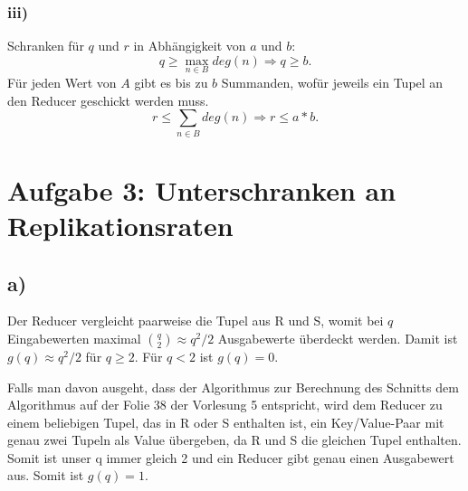 \documentclass{article}
\begin{document}

\subsubsection*{iii)}
Schranken f\"ur $q$ und $r$ in Abh\"angigkeit von $a$ und $b$:
$$q \geq \max_{n\in B} deg(n) \Rightarrow q \geq b.$$
F\"ur jeden Wert von $A$ gibt es bis zu $b$ Summanden, wof\"ur jeweils ein Tupel an den Reducer geschickt werden muss.
$$r \leq \sum_{n\in B} deg(n) \Rightarrow r \leq a*b.$$

\section*{Aufgabe 3: Unterschranken an Replikationsraten}

\subsection*{a)}
Der Reducer vergleicht paarweise die Tupel aus R und S, womit bei $q$ Eingabewerten maximal $\binom q 2 \approx q^2/2$ Ausgabewerte \"uberdeckt werden. Damit ist $g(q) \approx q^2/2$ f\"ur $q \geq 2$. F\"ur $q < 2$ ist $g(q) = 0$.

Falls man davon ausgeht, dass der Algorithmus zur Berechnung des Schnitts dem Algorithmus auf der Folie 38 der Vorlesung 5 entspricht, wird dem Reducer zu einem beliebigen Tupel, das in R oder S enthalten ist, ein Key/Value-Paar mit genau zwei Tupeln als Value \"ubergeben, da R und S die gleichen Tupel enthalten. Somit ist unser q immer gleich 2 und ein Reducer gibt genau einen Ausgabewert aus. Somit ist $g(q)=1$.
\end{document}
